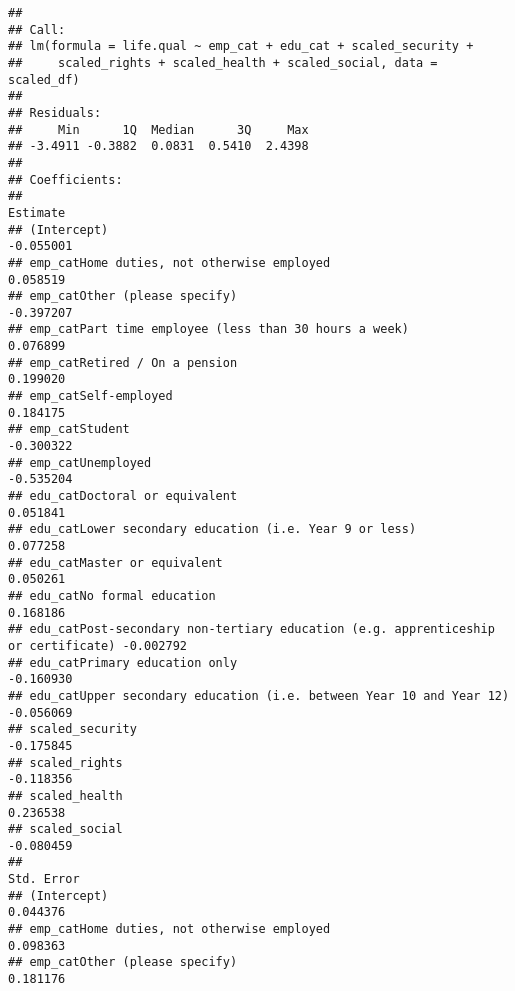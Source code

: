 \documentclass[
]{article}
\begin{document}
\begin{verbatim}
## 
## Call:
## lm(formula = life.qual ~ emp_cat + edu_cat + scaled_security + 
##     scaled_rights + scaled_health + scaled_social, data = scaled_df)
## 
## Residuals:
##     Min      1Q  Median      3Q     Max 
## -3.4911 -0.3882  0.0831  0.5410  2.4398 
## 
## Coefficients:
##                                                                                    Estimate
## (Intercept)                                                                       -0.055001
## emp_catHome duties, not otherwise employed                                         0.058519
## emp_catOther (please specify)                                                     -0.397207
## emp_catPart time employee (less than 30 hours a week)                              0.076899
## emp_catRetired / On a pension                                                      0.199020
## emp_catSelf-employed                                                               0.184175
## emp_catStudent                                                                    -0.300322
## emp_catUnemployed                                                                 -0.535204
## edu_catDoctoral or equivalent                                                      0.051841
## edu_catLower secondary education (i.e. Year 9 or less)                             0.077258
## edu_catMaster or equivalent                                                        0.050261
## edu_catNo formal education                                                         0.168186
## edu_catPost-secondary non-tertiary education (e.g. apprenticeship or certificate) -0.002792
## edu_catPrimary education only                                                     -0.160930
## edu_catUpper secondary education (i.e. between Year 10 and Year 12)               -0.056069
## scaled_security                                                                   -0.175845
## scaled_rights                                                                     -0.118356
## scaled_health                                                                      0.236538
## scaled_social                                                                     -0.080459
##                                                                                   Std. Error
## (Intercept)                                                                         0.044376
## emp_catHome duties, not otherwise employed                                          0.098363
## emp_catOther (please specify)                                                       0.181176

\end{verbatim}
\end{document}
